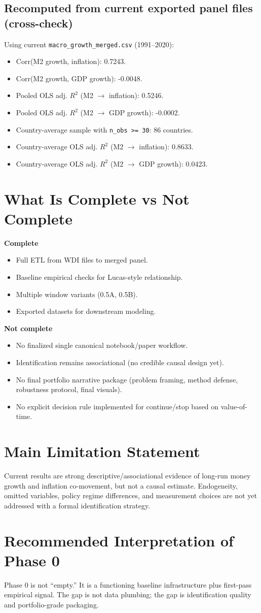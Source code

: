 \documentclass[11pt]{article}
\begin{document}
\subsection{Recomputed from current exported panel files (cross-check)}
Using current \texttt{macro\_growth\_merged.csv} (1991--2020):
\begin{itemize}
\item Corr(M2 growth, inflation): 0.7243.
\item Corr(M2 growth, GDP growth): -0.0048.
\item Pooled OLS adj. $R^2$ (M2 $\rightarrow$ inflation): 0.5246.
\item Pooled OLS adj. $R^2$ (M2 $\rightarrow$ GDP growth): -0.0002.
\item Country-average sample with \texttt{n\_obs >= 30}: 86 countries.
\item Country-average OLS adj. $R^2$ (M2 $\rightarrow$ inflation): 0.8633.
\item Country-average OLS adj. $R^2$ (M2 $\rightarrow$ GDP growth): 0.0423.
\end{itemize}

\section{What Is Complete vs Not Complete}
\textbf{Complete}
\begin{itemize}
\item Full ETL from WDI files to merged panel.
\item Baseline empirical checks for Lucas-style relationship.
\item Multiple window variants (0.5A, 0.5B).
\item Exported datasets for downstream modeling.
\end{itemize}

\textbf{Not complete}
\begin{itemize}
\item No finalized single canonical notebook/paper workflow.
\item Identification remains associational (no credible causal design yet).
\item No final portfolio narrative package (problem framing, method defense, robustness protocol, final visuals).
\item No explicit decision rule implemented for continue/stop based on value-of-time.
\end{itemize}

\section{Main Limitation Statement}
Current results are strong descriptive/associational evidence of long-run money growth and inflation co-movement, but not a causal estimate. Endogeneity, omitted variables, policy regime differences, and measurement choices are not yet addressed with a formal identification strategy.

\section{Recommended Interpretation of Phase 0}
Phase 0 is not ``empty.'' It is a functioning baseline infrastructure plus first-pass empirical signal. The gap is not data plumbing; the gap is identification quality and portfolio-grade packaging.
\end{document}
